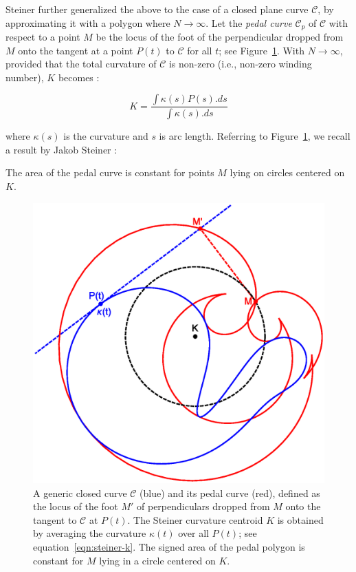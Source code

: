 Steiner further generalized the above to the case of a closed plane curve $\mathcal{C}$, by approximating it with a polygon where $N{\rightarrow}\infty$. Let the {\em pedal curve} $\mathcal{C}_p$ of $\mathcal{C}$ with respect to a point $M$ be the locus of the foot of the perpendicular dropped from $M$ onto 
  the tangent at a point $P(t)$ to $\mathcal{C}$
  for all $t$; see Figure~\ref{fig:steiner-general}. With $N{\rightarrow}\infty$,
provided that the total curvature of $\mathcal{C}$ is non-zero (i.e., non-zero winding number), $K$ becomes \cite{steiner1838}:

\begin{equation}
    K = \frac{\int{\kappa(s) P(s).ds}}{\int{\kappa(s).ds}}
    \label{eqn:steiner-k}
\end{equation}

\noindent where $\kappa(s)$ is the curvature and $s$ is arc length. Referring to Figure~\ref{fig:steiner-general}, we recall a result by Jakob Steiner \cite{steiner1838}:  

\begin{theorem*}[Steiner, 1825]
The area of the pedal curve is constant for  points $M$ lying on circles centered on $K$.
\end{theorem*}

\begin{figure}
    \centering
    \includegraphics[width=.5\textwidth]{pics/0007_general_poly_steiner.eps}
    \caption{A generic closed curve $\mathcal{C}$ (blue) and its pedal curve (red), defined as the locus of the foot $M'$ of perpendiculars dropped from $M$
    onto the tangent to $\mathcal C$ at $P(t)$.
     The Steiner curvature centroid $K$ is obtained by averaging the curvature $\kappa(t)$ over all $P(t)$; see equation~\eqref{eqn:steiner-k}. The signed area of the pedal polygon is constant for $M$ lying in a circle centered on $K$.}
    \label{fig:steiner-general}
\end{figure}


